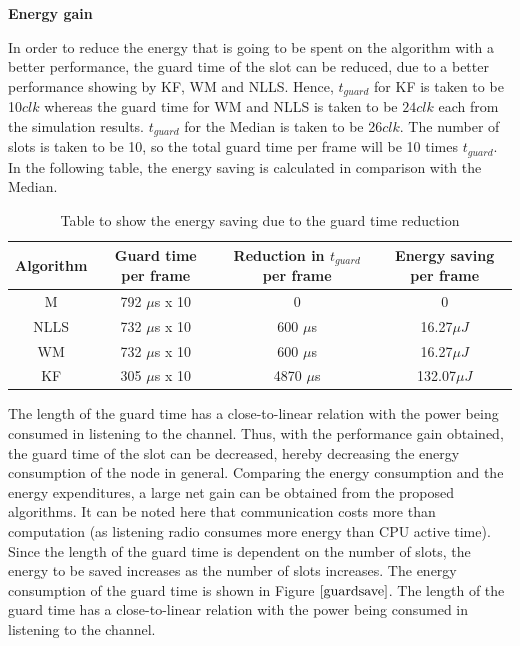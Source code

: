 \documentclass[a4paper,10pt]{report}
\begin{document}
\newline
\textbf{Energy gain}\par \noindent
In order to reduce the energy that is going to be spent on the algorithm with a better performance, the guard time of the slot can be reduced, due to a better performance showing by KF, WM and NLLS. 
Hence, $t_{guard}$ for KF is taken to be 10$clk$ whereas the guard time for WM and NLLS is taken to be $24clk$ each from the simulation results. $t_{guard}$ for the Median is taken to be 26$clk$. The number of slots is taken to be 10, so the total guard time per frame will be 10 times $t_{guard}$. In the following table, the energy saving is calculated in comparison with the Median. 
\begin{table}
        \caption{Table to show the energy saving due to the guard time reduction} 
    \begin{tabular}{ |c | c |c | c |  }
    \hline
    Algorithm & Guard time per frame & Reduction in $t_{guard}$ per frame & Energy saving per frame\\ \hline \hline
    M &  792 $\mu$s x 10 & 0 & 0 \\ \hline
    NLLS & 732 $\mu$s x 10 & 600 $\mu$s & 16.27$\mu J$\\ \hline
    WM &   732 $\mu$s x 10 & 600 $\mu$s & 16.27$\mu J$ \\ \hline
    KF &  305 $\mu$s x 10 & 4870 $\mu$s & 132.07$\mu J$\\ \hline
    \end{tabular}
\label{tab2}
\end{table}
The length of the guard time has a close-to-linear relation with the power being consumed in listening to the channel. Thus, with the performance gain obtained, the guard time of the slot can be decreased, hereby decreasing the energy consumption of the node in general. Comparing the energy consumption and the energy expenditures, a large net gain can be obtained from the proposed algorithms. It can be noted here that communication costs more than computation (as listening radio consumes more energy than CPU active time). Since the length of the guard time is dependent on the number of slots, the energy to be saved increases as the number of slots increases.\newline
The energy consumption of the guard time is shown in Figure $\ref{guardsave}$. The length of the guard time has a close-to-linear relation with the power being consumed in listening to the channel.
\end{document}
